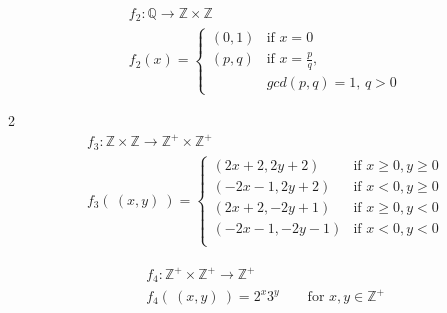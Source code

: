 \begin{align*}
    &f_2: \mathbb{Q} \to \mathbb{Z} \times \mathbb{Z} \\
    &f_2(x) = \begin{cases}
        (0,1) & \text{if $x = 0$} \\
        (p,q) & \text{if $x = \frac{p}{q}$,}\\
                & \text{$gcd(p,q) = 1$, $q > 0$}
    \end{cases}
\end{align*}
\begin{multicols}{2}
\begin{align*}
    &f_3: \mathbb{Z} \times \mathbb{Z} \to \mathbb{Z}^+ \times \mathbb{Z}^+ \\
    &f_3(~(x,y)~) = \begin{cases}
        (2x+2, 2y+2) & \text{if $x \geq 0, y \geq 0$} \\
        (-2x-1, 2y+2) & \text{if $x < 0, y \geq 0$} \\
        (2x+2, -2y+1) & \text{if $x \geq 0, y < 0$} \\
        (-2x-1, -2y-1) & \text{if $x < 0, y < 0$} \\
    \end{cases}
\end{align*}

\begin{align*}
    &f_4: \mathbb{Z}^+ \times \mathbb{Z}^+ \to \mathbb{Z}^+ \\
    &f_4(~(x,y)~) = 2^x 3^y \qquad \text{for $x,y \in \mathbb{Z}^+$}
\end{align*}
\end{multicols}